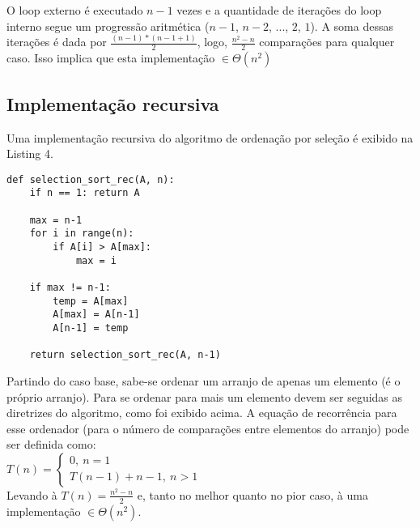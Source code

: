 \documentclass[a4paper, twocolumn]{article}
\theoremstyle{definition}
\begin{document}
O loop externo é executado $n-1$ vezes e a quantidade de iterações do loop interno segue um progressão aritmética ($n-1$, $n-2$, ..., $2$, $1$). A soma dessas iterações é dada por $\frac{(n-1)*(n-1+1)}{2}$, logo, $\frac{n^2-n}{2}$ comparações para qualquer caso. Isso implica que esta implementação $\in \Theta(n^2)$

\subsection{Implementação recursiva}

Uma implementação recursiva do algoritmo de ordenação por seleção é exibido na Listing 4.

\begin{lstlisting}[label=selection_sort_rec,caption= Selection Sort recursivo]
def selection_sort_rec(A, n):
    if n == 1: return A
    
    max = n-1
    for i in range(n):
        if A[i] > A[max]:
            max = i
    
    if max != n-1:
        temp = A[max]
        A[max] = A[n-1]
        A[n-1] = temp

    return selection_sort_rec(A, n-1)
\end{lstlisting}

Partindo do caso base, sabe-se ordenar um arranjo de apenas um elemento (é o próprio arranjo). Para se ordenar para mais um elemento devem ser seguidas as diretrizes do algoritmo, como foi exibido acima. A equação de recorrência para esse ordenador (para o número de comparações entre elementos do arranjo) pode ser definida como: \\

$T(n) = \begin{cases} 
	0, \ n = 1\\
	T(n-1) + n-1, \ n > 1
\end{cases}$ \\

Levando à $T(n) = \frac{n^2-n}{2}$ e, tanto no melhor quanto no pior caso, à uma implementação $\in \Theta(n^2)$.

	
	
	
\end{document}
